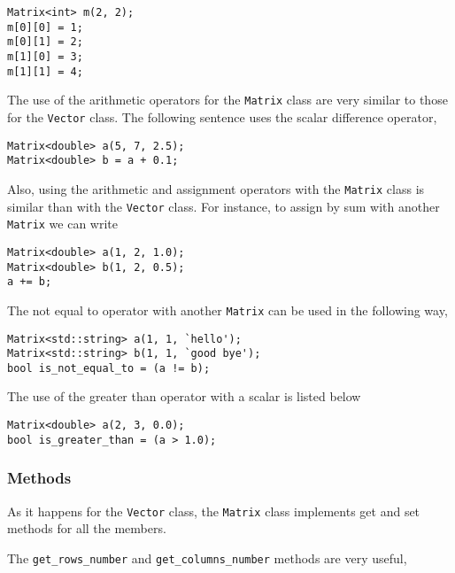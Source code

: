 
\begin{lstlisting}
Matrix<int> m(2, 2);
m[0][0] = 1;
m[0][1] = 2;
m[1][0] = 3;
m[1][1] = 4;
\end{lstlisting}


The use of the arithmetic operators for the \lstinline"Matrix" class are very similar to those for the \lstinline"Vector" class. The following sentence uses the scalar difference operator, 

\begin{lstlisting}
Matrix<double> a(5, 7, 2.5);
Matrix<double> b = a + 0.1;
\end{lstlisting}


Also, using the arithmetic and assignment operators with the \lstinline"Matrix" class is similar than with the \lstinline"Vector" class. For instance, to assign by sum with another \lstinline"Matrix" we can write

\begin{lstlisting}
Matrix<double> a(1, 2, 1.0);
Matrix<double> b(1, 2, 0.5);
a += b;
\end{lstlisting}


The not equal to operator with another \lstinline"Matrix" can be used in the following way, 

\begin{lstlisting}
Matrix<std::string> a(1, 1, `hello');
Matrix<std::string> b(1, 1, `good bye');
bool is_not_equal_to = (a != b);
\end{lstlisting}

The use of the greater than operator with a scalar is listed below

\begin{lstlisting}
Matrix<double> a(2, 3, 0.0);
bool is_greater_than = (a > 1.0);
\end{lstlisting}

\subsubsection*{Methods}

As it happens for the \lstinline"Vector" class, the \lstinline"Matrix" class implements get and set methods for all the members. 

The \lstinline"get_rows_number" and \lstinline"get_columns_number" methods are very useful, 

